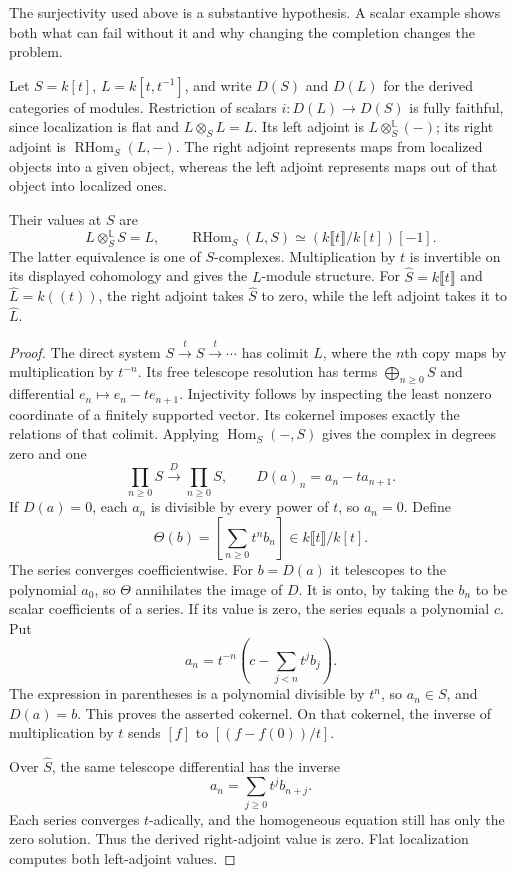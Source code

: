 The surjectivity used above is a substantive hypothesis. A scalar
example shows both what can fail without it and why changing the
completion changes the problem.

Let $S=k[t]$, $L=k[t,t^{-1}]$, and write $D(S)$ and $D(L)$ for
the derived categories of modules. Restriction of scalars
$i:D(L)\to D(S)$ is fully faithful, since localization is flat and
$L\otimes_S L=L$. Its left adjoint is
$L\otimes_S^{\mathbb L}(-)$; its right adjoint is
$\operatorname{RHom}_S(L,-)$. The right adjoint represents maps
from localized objects into a given object, whereas the left
adjoint represents maps out of that object into localized ones.

\begin{proposition}
\label{prop:vol2-localization-adjoints}
Their values at $S$ are
\[
 L\otimes_S^{\mathbb L}S=L,
 \qquad
 \operatorname{RHom}_S(L,S)
     \simeq(k\llbracket t\rrbracket/k[t])[-1].
\]
The latter equivalence is one of $S$-complexes. Multiplication by
$t$ is invertible on its displayed cohomology and gives the
$L$-module structure. For $\widehat S=k\llbracket t\rrbracket$
and $\widehat L=k((t))$, the right adjoint takes $\widehat S$ to
zero, while the left adjoint takes it to $\widehat L$.
\end{proposition}

\begin{proof}
The direct system $S\xrightarrow{t}S\xrightarrow{t}\cdots$ has
colimit $L$, where the $n$th copy maps by multiplication by $t^{-n}$.
Its free telescope resolution has terms $\bigoplus_{n\geq0}S$
and differential $e_n\mapsto e_n-te_{n+1}$. Injectivity follows
by inspecting the least nonzero coordinate of a finitely supported
vector. Its cokernel imposes exactly the relations of that colimit.
Applying $\operatorname{Hom}_S(-,S)$ gives the complex in degrees
zero and one
\begin{equation}\label{eq:vol2-polynomial-telescope}
 \prod_{n\geq0}S\xrightarrow{D}\prod_{n\geq0}S,
 \qquad D(a)_n=a_n-ta_{n+1}.
\end{equation}
If $D(a)=0$, each $a_n$ is divisible by every power of $t$, so
$a_n=0$. Define
\[
 \Theta(b)=\left[\sum_{n\geq0}t^nb_n\right]
               \in k\llbracket t\rrbracket/k[t].
\]
The series converges coefficientwise. For $b=D(a)$ it telescopes
to the polynomial $a_0$, so $\Theta$ annihilates the image of $D$.
It is onto, by taking the $b_n$ to be scalar coefficients of a series.
If its value is zero, the series equals a polynomial $c$. Put
\[
 a_n=t^{-n}\left(c-\sum_{j<n}t^jb_j\right).
\]
The expression in parentheses is a polynomial divisible by $t^n$,
so $a_n\in S$, and $D(a)=b$. This proves the asserted cokernel.
On that cokernel, the inverse of multiplication by $t$ sends
$[f]$ to $[(f-f(0))/t]$.

Over $\widehat S$, the same telescope differential has the inverse
\[
 a_n=\sum_{j\geq0}t^j b_{n+j}.
\]
Each series converges $t$-adically, and the homogeneous equation
still has only the zero solution. Thus the derived right-adjoint
value is zero. Flat localization computes both left-adjoint values.
\end{proof}

